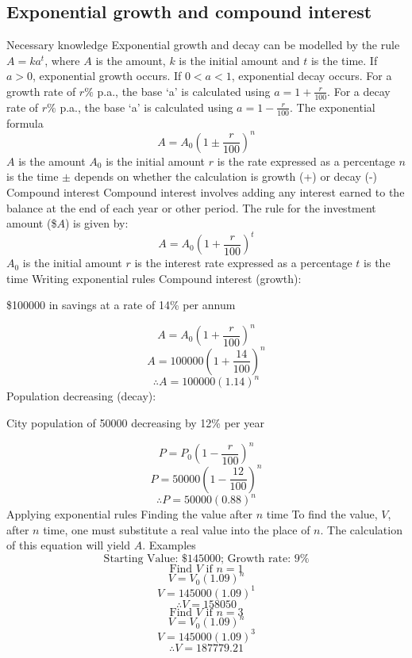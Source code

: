 \begin{outline}
\0
\subsection{Exponential growth and compound interest}
	\1 Necessary knowledge
		\2 Exponential growth and decay can be modelled by the rule $A = ka^t$, where $A$ is the amount, $k$ is the initial amount and $t$ is the time. If $a > 0$, exponential growth occurs. If $0 < a < 1$, exponential decay occurs.
		\2 For a growth rate of $r\%$ p.a., the base `a' is calculated using $a = 1 + \frac{r}{100}$.
		\2 For a decay rate of $r\%$ p.a., the base `a' is calculated using $a = 1 - \frac{r}{100}$.
	\1 The exponential formula
		\[A = A_0\left(1 \pm \frac{r}{100}\right)^n\]
		\2 $A$ is the amount
		\2 $A_0$ is the initial amount
		\2 $r$ is the rate expressed as a percentage
		\2 $n$ is the time
		\2 $\pm$ depends on whether the calculation is growth (+) or decay (-)
	\1 Compound interest
		\2 Compound interest involves adding any interest earned to the balance at the end of each year or other period. The rule for the investment amount (\$$A$) is given by:
			\[A = A_0\left(1 + \frac{r}{100}\right)^t\]
			\3 $A_0$ is the initial amount
			\3 $r$ is the interest rate expressed as a percentage
			\3 $t$ is the time
	\1 Writing exponential rules
		\2 Compound interest (growth):
		
			\$100000 in savings at a rate of 14\% per annum
			
			\[A = A_0\left(1 + \frac{r}{100}\right)^n\]
			\[A = 100000\left(1 + \frac{14}{100}\right)^n\]
			\[\therefore A = 100000\left(1.14\right)^n\]
		\2 Population decreasing (decay):
		
			City population of 50000 decreasing by 12\% per year
			
			\[P = P_0\left(1 - \frac{r}{100}\right)^n\]
			\[P = 50000\left(1 - \frac{12}{100}\right)^n\]
			\[\therefore P = 50000\left(0.88\right)^n\]
	\1 Applying exponential rules
		\2 Finding the value after $n$ time
			\3 To find the value, $V$, after $n$ time, one must substitute a real value into the place of $n$. The calculation of this equation will yield $A$.
				\4 Examples
					\[\text{Starting Value: } \$145000 \text{; Growth rate: } 9\%\]
					\[\text{Find $V$ if $n = 1$}\]
					\[V = V_0\left(1.09\right)^n\]
					\[V = 145000\left(1.09\right)^1\]
					\[\therefore V = 158050\]
					\[\]
					\[\text{Find $V$ if $n = 3$}\]
					\[V = V_0\left(1.09\right)^n\]
					\[V = 145000\left(1.09\right)^3\]
					\[\therefore V = 187779.21\]

\end{outline}
